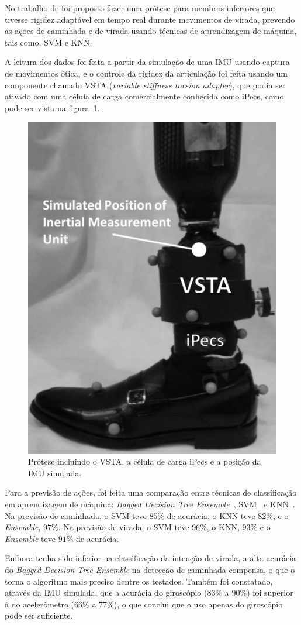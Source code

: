 No trabalho de  foi proposto fazer uma prótese para membros inferiores que tivesse rigidez adaptável em tempo real durante movimentos de virada, prevendo as ações de caminhada e de virada usando técnicas de aprendizagem de máquina, tais como, SVM e KNN\@.

A leitura dos dados foi feita a partir da simulação de uma IMU usando captura de movimentos ótica, e o controle da rigidez da articulação foi feita usando um componente chamado VSTA (\textit{variable stiffness torsion adapter}), que podia ser ativado com uma célula de carga comercialmente conhecida como iPecs, como pode ser visto na figura~\ref{fig:rel_turnintent_1}.

\begin{figure}[ht]
	\caption{\label{fig:rel_turnintent_1}Prótese incluindo o VSTA, a célula de carga iPecs e a posição da IMU simulada.}
	\begin{center}
	    \includegraphics[width=.25\textwidth]{resources/rel_pew_turnintent_1}
	\end{center}
\end{figure}

Para a previsão de ações, foi feita uma comparação entre técnicas de classificação em aprendizagem de máquina: \textit{Bagged Decision Tree Ensemble}~\cite{breiman:1996bagging}\cite{dietterich:2000ensemble}, SVM~\cite{cortes:1995svm} e KNN~\cite{cover:1967knn}\@. Na previsão de caminhada, o SVM teve \(85\%\) de acurácia, o KNN teve \(82\%\), e o \textit{Ensemble}, \(97\%\). Na previsão de virada, o SVM teve \(96\%\), o KNN, \(93\%\) e o \textit{Ensemble} teve \(91\%\) de acurácia.

Embora tenha sido inferior na classificação da intenção de virada, a alta acurácia do \textit{Bagged Decision Tree Ensemble} na detecção de caminhada compensa, o que o torna o algoritmo mais preciso dentre os testados. Também foi constatado, através da IMU simulada, que a acurácia do giroscópio (\(83\%\) a \(90\%\)) foi superior à do acelerômetro (\(66\%\) a \(77\%\)), o que conclui que o uso apenas do giroscópio pode ser suficiente.

